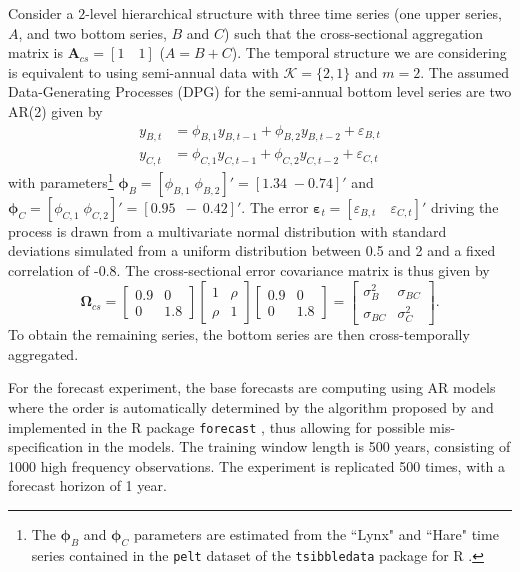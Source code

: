 \documentclass[a4paper,11pt]{article}
\newcommand{\epsvet}{\bm{\varepsilon}}
\newcommand{\Avet}{\bm{A}}
\newcommand{\Omegavet}{\bm{\Omega}}
\newcommand{\phivet}{\bm{\phi}}
\theoremstyle{definition}
\begin{document}
Consider a $2$-level hierarchical structure with three time series (one upper series, $A$, and two bottom series, $B$ and $C$) such that the cross-sectional aggregation matrix is $\Avet_{cs} = \left[ 1 \quad 1 \right]$ ($A = B+C$). The temporal structure we are considering is equivalent to using semi-annual data with $\mathcal{K} = \{2,1\}$ and $m = 2$. The assumed Data-Generating Processes (DPG) for the semi-annual bottom level series are two AR(2) given by
$$
\begin{aligned}
	y_{B,t} &= \phi_{B, 1} y_{B,t-1} + \phi_{B, 2} y_{B,t-2} + \varepsilon_{B, t}\\
	y_{C,t} &= \phi_{C, 1} y_{C,t-1} + \phi_{C, 2} y_{C,t-2} + \varepsilon_{C, t}
\end{aligned}
$$
with parameters\footnote{The $\phivet_B$ and $\phivet_C$ parameters are estimated from the “Lynx" and “Hare" time series contained in the \texttt{pelt} dataset of the \texttt{tsibbledata} package for R \citep{ohara-wild2022}.} $\phivet_B = [\phi_{B,1}\; \phi_{B,2}]' = [1.34\; -0.74]'$ and $\phivet_C  = [\phi_{C,1}\; \phi_{C,2}]' = [0.95\;~-~0.42]'$. The error $\epsvet_t = \left[\varepsilon_{B, t}\quad \varepsilon_{C, t}\right]'$ driving the process is drawn from a multivariate normal distribution with standard deviations simulated from a uniform distribution between 0.5 and 2 and a fixed correlation of -0.8. The cross-sectional error covariance matrix is thus given by
$$
	\Omegavet_{cs} = \begin{bmatrix}
		0.9 & 0   \\
		0   & 1.8
	\end{bmatrix} \begin{bmatrix}
		1    & \rho \\
		\rho & 1
	\end{bmatrix} \begin{bmatrix}
		0.9 & 0   \\
		0   & 1.8
	\end{bmatrix} = \begin{bmatrix}
		\sigma_B^2  & \sigma_{BC} \\
		\sigma_{BC} & \sigma_C^2
	\end{bmatrix}.
$$
To obtain the remaining series, the bottom series are then cross-temporally aggregated.

For the forecast experiment, the base forecasts are computing using AR models where the order is automatically determined by the algorithm proposed by \cite{hyndman2008a} and implemented in the R package \texttt{forecast} \citep{Rforecast}, thus allowing for possible mis-specification in the models. The training window length is 500 years, consisting of 1000 high frequency observations. The experiment is replicated 500 times, with a forecast horizon of 1 year.
\end{document}
